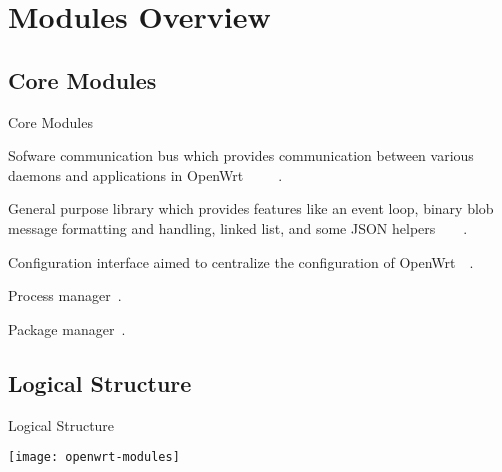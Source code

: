 \section{Modules Overview}

\subsection{Core Modules}
\begin{frame}{Core Modules}
    \pause
    \begin{description}[<+-|alert@+>]
        \item[ubus] Sofware communication bus which provides communication between various daemons and applications in OpenWrt~\cite{openwrt-ubus}~\cite{lutfi-ubus}~\cite{lutfi-ubox_ubus}~\cite{openwrt-rpc_guide}~\cite{openwrt-rpc_techref}.
        \item[ubox] General purpose library which provides features like an event loop, binary blob message formatting and handling, linked list, and some JSON helpers~\cite{openwrt-ubox}~\cite{openwrt-libubox}~\cite{lutfi-ubox_ubus}~\cite{openwrt-log}.
        \item[uci] Configuration interface aimed to centralize the configuration of OpenWrt~\cite{openwrt-uci}~\cite{openwrt-libuci}.
        \item[procd] Process manager~\cite{openwrt-procd}.
        \item[opkg] Package manager~\cite{openwrt-opkg}.
    \end{description}
\end{frame}

\subsection{Logical Structure}
\begin{frame}{Logical Structure}
    \centerline{\texttt{[image: openwrt-modules]}}
\end{frame}
